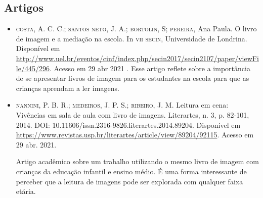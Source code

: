 \documentclass[11pt]{extarticle}
\begin{document}
\subsection{Artigos}

\begin{itemize}
\item \textsc{costa}, A. C. C.; \textsc{santos neto}, J. A.; \textsc{bortolin}, S; \textsc{pereira}, Ana Paula. O livro de imagem e a mediação na escola. 
In \textsc{vii secin}, Universidade de Londrina. Disponível em \url{http://www.uel.br/eventos/cinf/index.php/secin2017/secin2107/paper/viewFile/445/296}. 
Acesso em 29 abr 2021
. 
Esse artigo reflete sobre a importância de se apresentar livros de imagem para os estudantes na escola para que as crianças aprendam a ler imagens. 

\item \textsc{nannini}, P. B. R.; \textsc{medeiros}, J. P. S.; \textsc{ribeiro}, J. M. Leitura em cena: Vivências em sala de aula com livro de imagens. 
Literartes, n. 3, p. 82-101, 2014. DOI: 10.11606/issn.2316-9826.literartes.2014.89204. 
Disponível em \url{https://www.revistas.usp.br/literartes/article/view/89204/92115}. Acesso em 29 abr. 2021. 

Artigo acadêmico sobre um trabalho utilizando o mesmo livro de imagem com crianças da educação infantil e ensino médio. 
É uma forma interessante de perceber que a leitura de imagens pode ser explorada com qualquer faixa etária. 
\end{itemize}

% 
\end{document}
